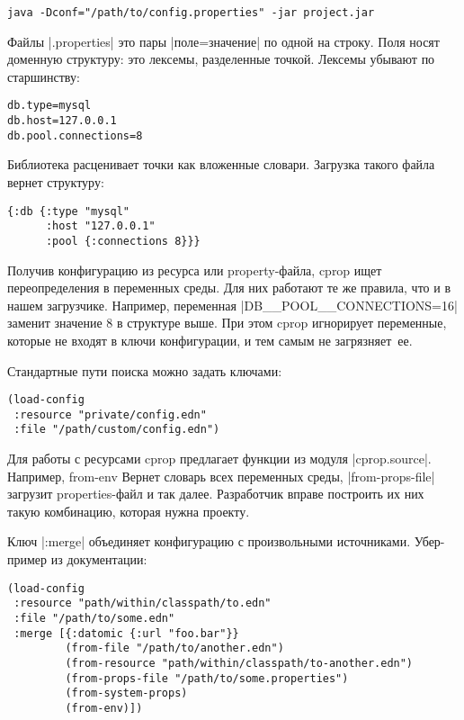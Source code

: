 \begin{verbatim}
java -Dconf="/path/to/config.properties" -jar project.jar
\end{verbatim}

Файлы \spverb|.properties| это пары \spverb|поле=значение| по одной на строку. Поля носят
доменную структуру: это лексемы, разделенные точкой. Лексемы убывают по
старшинству:

\begin{verbatim}
db.type=mysql
db.host=127.0.0.1
db.pool.connections=8
\end{verbatim}

Библиотека расценивает точки как вложенные словари. Загрузка такого файла вернет
структуру:

\begin{verbatim}
{:db {:type "mysql"
      :host "127.0.0.1"
      :pool {:connections 8}}}
\end{verbatim}

Получив конфигурацию из ресурса или property-файла, cprop ищет переопределения в
переменных среды. Для них работают те же правила, что и в нашем
загрузчике. Например, переменная \spverb|DB__POOL__CONNECTIONS=16| заменит
значение 8 в структуре выше. При этом cprop игнорирует переменные, которые не
входят в ключи конфигурации, и тем самым не загрязняет~ее.

Стандартные пути поиска можно задать ключами:

\begin{verbatim}
(load-config
 :resource "private/config.edn"
 :file "/path/custom/config.edn")
\end{verbatim}

Для работы с ресурсами cprop предлагает функции из модуля
\spverb|cprop.source|. Например, from-env Вернет словарь всех переменных среды,
\spverb|from-props-file| загрузит properties-файл и так далее. Разработчик вправе
построить их них такую комбинацию, которая нужна проекту.

Ключ \spverb|:merge| объединяет конфигурацию с произвольными источниками. Убер-пример
из документации:

\begin{verbatim}
(load-config
 :resource "path/within/classpath/to.edn"
 :file "/path/to/some.edn"
 :merge [{:datomic {:url "foo.bar"}}
         (from-file "/path/to/another.edn")
         (from-resource "path/within/classpath/to-another.edn")
         (from-props-file "/path/to/some.properties")
         (from-system-props)
         (from-env)])
\end{verbatim}

